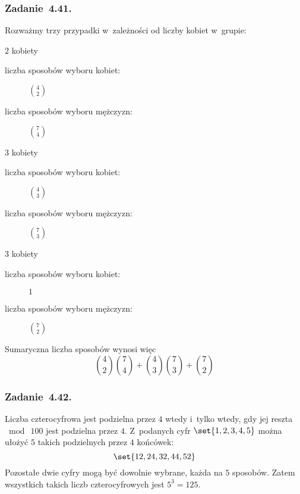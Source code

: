 \subsubsection*{Zadanie~4.41.}
Rozważmy trzy przypadki w~zależności od liczby kobiet w~grupie:
\begin{proofcases}
    \item \(2\) kobiety
        \begin{description}
            \item[liczba sposobów wyboru kobiet:] \(\binom{4}{2}\)
            \item[liczba sposobów wyboru mężczyzn:] \(\binom{7}{4}\)
        \end{description}
    \item \(3\) kobiety
        \begin{description}
            \item[liczba sposobów wyboru kobiet:] \(\binom{4}{3}\)
            \item[liczba sposobów wyboru mężczyzn:] \(\binom{7}{3}\)
        \end{description}
    \item \(3\) kobiety
        \begin{description}
            \item[liczba sposobów wyboru kobiet:] \(1\)
            \item[liczba sposobów wyboru mężczyzn:] \(\binom{7}{2}\)
        \end{description}
\end{proofcases}
Sumaryczna liczba sposobów wynosi więc
\begin{equation*}
    \binom{4}{2}\binom{7}{4} + \binom{4}{3}\binom{7}{3} + \binom{7}{2}
\end{equation*}
\subsubsection*{Zadanie~4.42.}
Liczba czterocyfrowa jest podzielna przez \(4\) wtedy i~tylko wtedy, gdy jej reszta \(\bmod\ 100\) jest podzielna przez \(4\). Z~podanych cyfr \(\set{1, 2, 3, 4, 5}\) można ułożyć \(5\) takich podzielnych przez \(4\) końcówek:
\begin{equation*}
    \set{12, 24, 32, 44, 52}
\end{equation*}
Pozostałe dwie cyfry mogą być dowolnie wybrane, każda na \(5\) sposobów. Zatem wszystkich takich liczb czterocyfrowych jest \(5^3 = 125\).
